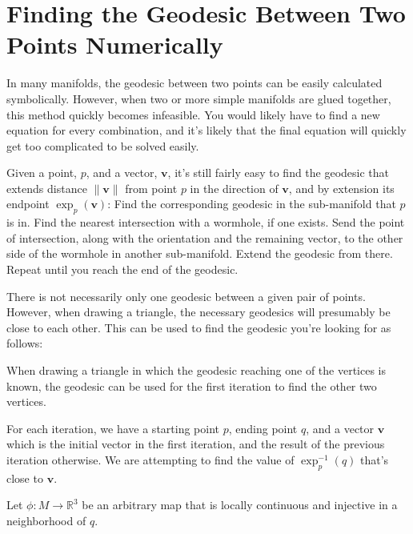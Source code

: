 \section{Finding the Geodesic Between Two Points Numerically}


In many manifolds, the geodesic between two points can be easily calculated symbolically. However, when two or more simple manifolds are glued together, this method quickly becomes infeasible. You would likely have to find a new equation for every combination, and it's likely that the final equation will quickly get too complicated to be solved easily.

Given a point, $p$, and a vector, $\textbf{v}$, it's still fairly easy to find the geodesic that extends distance $\|\textbf{v}\|$ from point $p$ in the direction of $\textbf{v}$, and by extension its endpoint $\exp_p(\textbf{v})$: Find the corresponding geodesic in the sub-manifold that $p$ is in. Find the nearest intersection with a wormhole, if one exists. Send the point of intersection, along with the orientation and the remaining vector, to the other side of the wormhole in another sub-manifold. Extend the geodesic from there. Repeat until you reach the end of the geodesic.

There is not necessarily only one geodesic between a given pair of points. However, when drawing a triangle, the necessary geodesics will presumably be close to each other. This can be used to find the geodesic you're looking for as follows:

When drawing a triangle in which the geodesic reaching one of the vertices is known, the geodesic can be used for the first iteration to find the other two vertices.

For each iteration, we have a starting point $p$, ending point $q$, and a vector $\textbf{v}$ which is the initial vector in the first iteration, and the result of the previous iteration otherwise. We are attempting to find the value of $\exp^{-1}_p(q)$ that's close to $\textbf{v}$.

Let $\phi:M \to \mathbb{R}^3$ be an arbitrary map that is locally continuous and injective in a neighborhood of $q$. %

